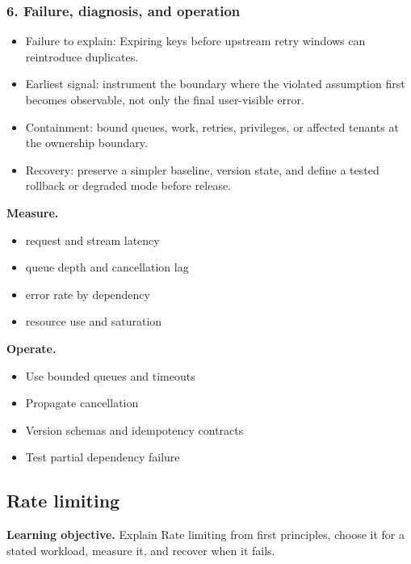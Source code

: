 \subsubsection*{6. Failure, diagnosis, and operation}
\begin{itemize}
\item Failure to explain: Expiring keys before upstream retry windows can reintroduce duplicates.
\item Earliest signal: instrument the boundary where the violated assumption first becomes observable, not only the final user-visible error.
\item Containment: bound queues, work, retries, privileges, or affected tenants at the ownership boundary.
\item Recovery: preserve a simpler baseline, version state, and define a tested rollback or degraded mode before release.
\end{itemize}
\textbf{Measure.}\begin{itemize}
\item request and stream latency
\item queue depth and cancellation lag
\item error rate by dependency
\item resource use and saturation
\end{itemize}
\textbf{Operate.}\begin{itemize}
\item Use bounded queues and timeouts
\item Propagate cancellation
\item Version schemas and idempotency contracts
\item Test partial dependency failure
\end{itemize}
\subsection{Rate limiting}
\textbf{Learning objective.} Explain Rate limiting from first principles, choose it for a stated workload, measure it, and recover when it fails.
